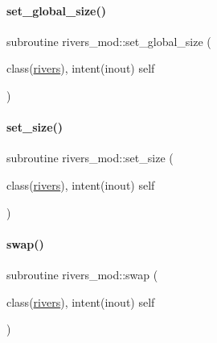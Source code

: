 \mbox{\label{namespacerivers__mod_a1b5ad1b541c200f76f6853d0643cff8c}} 
\paragraph{\texorpdfstring{set\+\_\+global\+\_\+size()}{set\_global\_size()}}
{\footnotesize\ttfamily subroutine rivers\+\_\+mod\+::set\+\_\+global\+\_\+size (\begin{DoxyParamCaption}\item[{class(\mbox{\hyperlink{structrivers__mod_1_1rivers}{rivers}}), intent(inout)}]{self }\end{DoxyParamCaption})\hspace{0.3cm}{\ttfamily [private]}}

\mbox{\label{namespacerivers__mod_a0069946854e918ce95bc352a042e4adc}} 
\paragraph{\texorpdfstring{set\+\_\+size()}{set\_size()}}
{\footnotesize\ttfamily subroutine rivers\+\_\+mod\+::set\+\_\+size (\begin{DoxyParamCaption}\item[{class(\mbox{\hyperlink{structrivers__mod_1_1rivers}{rivers}}), intent(inout)}]{self }\end{DoxyParamCaption})\hspace{0.3cm}{\ttfamily [private]}}

\mbox{\label{namespacerivers__mod_a340271fac5c88e55d12cbfd63f064b23}} 
\paragraph{\texorpdfstring{swap()}{swap()}}
{\footnotesize\ttfamily subroutine rivers\+\_\+mod\+::swap (\begin{DoxyParamCaption}\item[{class(\mbox{\hyperlink{structrivers__mod_1_1rivers}{rivers}}), intent(inout)}]{self }\end{DoxyParamCaption})\hspace{0.3cm}{\ttfamily [private]}}

